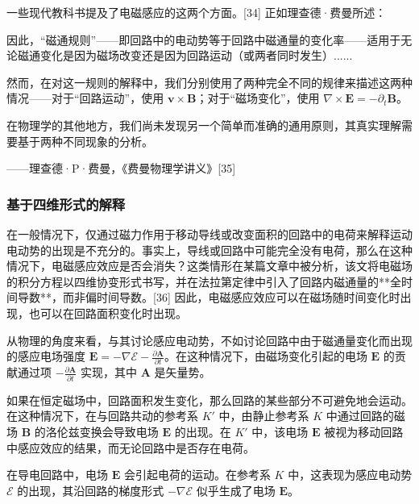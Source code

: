 一些现代教科书提及了电磁感应的这两个方面。[34] 正如理查德·费曼所述：

因此，“磁通规则”——即回路中的电动势等于回路中磁通量的变化率——适用于无论磁通变化是因为磁场改变还是因为回路运动（或两者同时发生）......  

然而，在对这一规则的解释中，我们分别使用了两种完全不同的规律来描述这两种情况——对于“回路运动”，使用 \(\mathbf{v} \times \mathbf{B}\)；对于“磁场变化”，使用 \(\nabla \times \mathbf{E} = -\partial_t \mathbf{B}\)。  

在物理学的其他地方，我们尚未发现另一个简单而准确的通用原则，其真实理解需要基于两种不同现象的分析。  

——理查德·P·费曼，《费曼物理学讲义》[35]
\subsubsection{基于四维形式的解释}
在一般情况下，仅通过磁力作用于移动导线或改变面积的回路中的电荷来解释运动电动势的出现是不充分的。事实上，导线或回路中可能完全没有电荷，那么在这种情况下，电磁感应效应是否会消失？这类情形在某篇文章中被分析，该文将电磁场的积分方程以四维协变形式书写，并在法拉第定律中引入了回路内磁通量的**全时间导数**，而非偏时间导数。[36] 因此，电磁感应效应可以在磁场随时间变化时出现，也可以在回路面积变化时出现。

从物理的角度来看，与其讨论感应电动势，不如讨论回路中由于磁通量变化而出现的感应电场强度 \(\mathbf{E} = -\nabla \mathcal{E} - \frac{\partial \mathbf{A}}{\partial t}\)。在这种情况下，由磁场变化引起的电场 \(\mathbf{E}\) 的贡献通过项 \(-\frac{\partial \mathbf{A}}{\partial t}\) 实现，其中 \(\mathbf{A}\) 是矢量势。

如果在恒定磁场中，回路面积发生变化，那么回路的某些部分不可避免地会运动。在这种情况下，在与回路共动的参考系 \(K'\) 中，由静止参考系 \(K\) 中通过回路的磁场 \(\mathbf{B}\) 的洛伦兹变换会导致电场 \(\mathbf{E}\) 的出现。在 \(K'\) 中，该电场 \(\mathbf{E}\) 被视为移动回路中感应效应的结果，而无论回路中是否存在电荷。

在导电回路中，电场 \(\mathbf{E}\) 会引起电荷的运动。在参考系 \(K\) 中，这表现为感应电动势 \(\mathcal{E}\) 的出现，其沿回路的梯度形式 \(-\nabla \mathcal{E}\) 似乎生成了电场 \(\mathbf{E}\)。